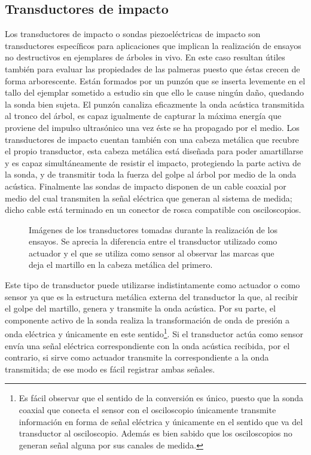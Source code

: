 \subsection{Transductores de impacto}

Los transductores de impacto o sondas piezoeléctricas de impacto son
transductores específicos para aplicaciones que implican la realización de
ensayos no destructivos en ejemplares de árboles in vivo. En este caso
resultan útiles también para evaluar las propiedades de las palmeras puesto
que éstas crecen de forma arborescente. Están formados por un punzón que se
inserta levemente en el tallo del ejemplar sometido a estudio sin que ello
le cause ningún daño, quedando la sonda bien sujeta. El punzón canaliza
eficazmente la onda acústica transmitida al tronco del árbol, es capaz
igualmente de capturar la máxima energía que proviene del impulso
ultrasónico una vez éste se ha propagado por el medio. Los transductores de
impacto cuentan también con una cabeza metálica que recubre el propio
transductor, esta cabeza metálica está diseñada para poder amartillarse y
es capaz simultáneamente de resistir el impacto, protegiendo la parte
activa de la sonda, y de transmitir toda la fuerza del golpe al árbol por
medio de la onda acústica. Finalmente las sondas de impacto disponen de un
cable coaxial por medio del cual transmiten la señal eléctrica que generan
al sistema de medida; dicho cable está terminado en un conector de rosca
compatible con osciloscopios.

\begin{figure}
    \begin{center}
	\qquad
    \end{center}
    \caption[Transductores de impacto utilizados durante los
    ensayos]{Imágenes de los transductores tomadas durante la realización
    de los ensayos. Se aprecia la diferencia entre el transductor utilizado
    como actuador y el que se utiliza como sensor al observar las marcas
    que deja el martillo en la cabeza metálica del primero.}
    \label{fig:transducers}
\end{figure}

Este tipo de transductor puede utilizarse indistintamente como actuador o
como sensor ya que es la estructura metálica externa del transductor la
que, al recibir el golpe del martillo, genera y transmite la onda acústica.
Por su parte, el componente activo de la sonda realiza la transformación de
onda de presión a onda eléctrica y únicamente en este sentido\footnote{Es
fácil observar que el sentido de la conversión es único, puesto que la
sonda coaxial que conecta el sensor con el osciloscopio únicamente
transmite información en forma de señal eléctrica y únicamente en el
sentido que va del transductor al osciloscopio. Además es bien sabido que
los osciloscopios no generan señal alguna por sus canales de medida.}. Si
el transductor actúa como sensor envía una señal eléctrica correspondiente
con la onda acústica recibida, por el contrario, si sirve como actuador
transmite la correspondiente a la onda transmitida; de ese modo es fácil
registrar ambas señales.

